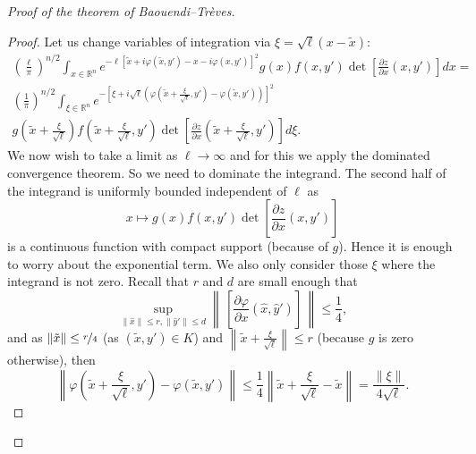 \documentclass[12pt,openany]{book}
\newcommand{\snorm}[1]{\lVert {#1} \rVert}
\newcommand{\norm}[1]{\left\lVert {#1} \right\rVert}
\newcommand{\R}{{\mathbb{R}}}
\theoremstyle{plain}
\theoremstyle{remark}
\theoremstyle{definition}
\theoremstyle{exercise}
\theoremstyle{example}
\begin{document}
\begin{proof}[Proof of the theorem of Baouendi--Tr{\`e}ves]
\begin{proof}
Let us change variables of integration via $\xi = \sqrt{\ell} ( x-\tilde{x})$:
\begin{multline*}
{\left(\frac{\ell}{\pi}\right)}^{n/2}
\int_{x \in \R^n}
e^{  -\ell [\tilde{x}+i\varphi(\tilde{x},y') - x-i\varphi(x,y')]^2 } g(x) f(x,y')
\det \left[\frac{\partial z}{\partial x}(x,y')\right] dx
=
\\
{\left(\frac{1}{\pi}\right)}^{n/2}
\int_{\xi \in \R^n}
e^{-{\left[\xi +
i\sqrt{\ell}\left(\varphi\left(\tilde{x}+\frac{\xi}{\sqrt{\ell}},y'\right) -
\varphi(\tilde{x},y')\right)\right  ]}^2}
\\
g\left(\tilde{x}+\frac{\xi}{\sqrt{\ell}}\right)
f\left(\tilde{x}+\frac{\xi}{\sqrt{\ell}},y'\right)
\det \left[\frac{\partial z}{\partial
x}\left(\tilde{x}+\frac{\xi}{\sqrt{\ell}},y'\right)\right] d\xi .
\end{multline*}
We now wish to take a limit as $\ell \to \infty$ and for this we apply
the dominated convergence theorem.
So we need to dominate the integrand.
The second half of the integrand is uniformly bounded independent of
$\ell$ as 
\begin{equation*}
x \mapsto g(x) f(x,y') \det \left[\frac{\partial z}{\partial x}(x,y')\right]
\end{equation*}
is a continuous function with compact support (because of $g$).
Hence it is enough to worry about the exponential term.
We also only consider those $\xi$ where the integrand is not zero.
Recall that $r$ and $d$ are small enough that
\begin{equation*}
\sup_{\snorm{\hat{x}} \leq r, \snorm{\hat{y}'} \leq d}
\norm{\,\left[
\frac{ \partial \varphi}{\partial  x}(\hat{x},\hat{y}')
\right]\,} \leq \frac{1}{4} ,
\end{equation*}
and as $\snorm{\tilde{x}} \leq \nicefrac{r}{4}$ (as
$(\tilde{x},y') \in K$) and
$\norm{\tilde{x}+\frac{\xi}{\sqrt{\ell}}} \leq r$ (because $g$ is
zero otherwise), then
\begin{equation*}
\norm{\varphi\left(\tilde{x}+\frac{\xi}{\sqrt{\ell}},y'\right) -
\varphi(\tilde{x},y')}
\leq \frac{1}{4} \norm{\tilde{x}+\frac{\xi}{\sqrt{\ell}}-\tilde{x}} =
\frac{\snorm{\xi}}{4 \sqrt{\ell}} .
\end{equation*}


\end{proof}
\end{proof}
\end{document}
